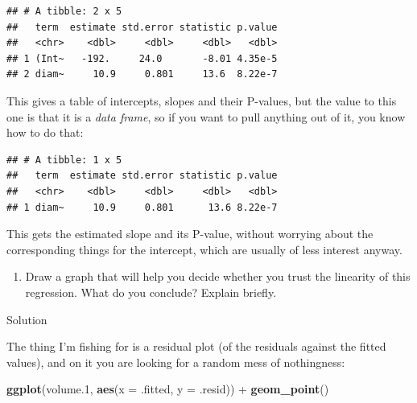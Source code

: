 \documentclass[]{tufte-book}
\newenvironment{Shaded}{}{}
\newcommand{\DataTypeTok}[1]{\textcolor[rgb]{0.56,0.13,0.00}{#1}}
\newcommand{\FloatTok}[1]{\textcolor[rgb]{0.25,0.63,0.44}{#1}}
\newcommand{\KeywordTok}[1]{\textcolor[rgb]{0.00,0.44,0.13}{\textbf{#1}}}
\newcommand{\NormalTok}[1]{#1}
\newcommand{\OperatorTok}[1]{\textcolor[rgb]{0.40,0.40,0.40}{#1}}
\newcommand{\StringTok}[1]{\textcolor[rgb]{0.25,0.44,0.63}{#1}}
\providecommand{\tightlist}{%
  \setlength{\itemsep}{0pt}\setlength{\parskip}{0pt}}
\theoremstyle{definition}
\theoremstyle{definition}
\theoremstyle{definition}
\theoremstyle{remark}
\begin{document}
\begin{verbatim}
## # A tibble: 2 x 5
##   term  estimate std.error statistic p.value
##   <chr>    <dbl>     <dbl>     <dbl>   <dbl>
## 1 (Int~   -192.     24.0       -8.01 4.35e-5
## 2 diam~     10.9     0.801     13.6  8.22e-7
\end{verbatim}

This gives a table of intercepts, slopes and their P-values, but the
value to this one is that it is a \emph{data frame}, so if you want to
pull anything out of it, you know how to do that:

\begin{Shaded}
\end{Shaded}

\begin{verbatim}
## # A tibble: 1 x 5
##   term  estimate std.error statistic p.value
##   <chr>    <dbl>     <dbl>     <dbl>   <dbl>
## 1 diam~     10.9     0.801      13.6 8.22e-7
\end{verbatim}

This gets the estimated slope and its P-value, without worrying about
the corresponding things for the intercept, which are usually of less
interest anyway.

\begin{enumerate}
\def\labelenumi{(\alph{enumi})}
\setcounter{enumi}{4}
\tightlist
\item
  Draw a graph that will help you decide whether you trust the linearity
  of this regression. What do you conclude? Explain briefly.
\end{enumerate}

Solution

The thing I'm fishing for is a residual plot (of the residuals against
the fitted values), and on it you are looking for a random mess of
nothingness:

\begin{Shaded}
\begin{Highlighting}[]
\KeywordTok{ggplot}\NormalTok{(volume}\FloatTok{.1}\NormalTok{, }\KeywordTok{aes}\NormalTok{(}\DataTypeTok{x =}\NormalTok{ .fitted, }\DataTypeTok{y =}\NormalTok{ .resid)) }\OperatorTok{+}\StringTok{ }
\StringTok{    }\KeywordTok{geom_point}\NormalTok{()}
\end{Highlighting}
\end{Shaded}
\end{document}
